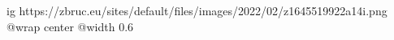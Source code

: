  
 
 
 
 

\ifcmt
  ig https://zbruc.eu/sites/default/files/images/2022/02/z1645519922a14i.png
  @wrap center
  @width 0.6
\fi
